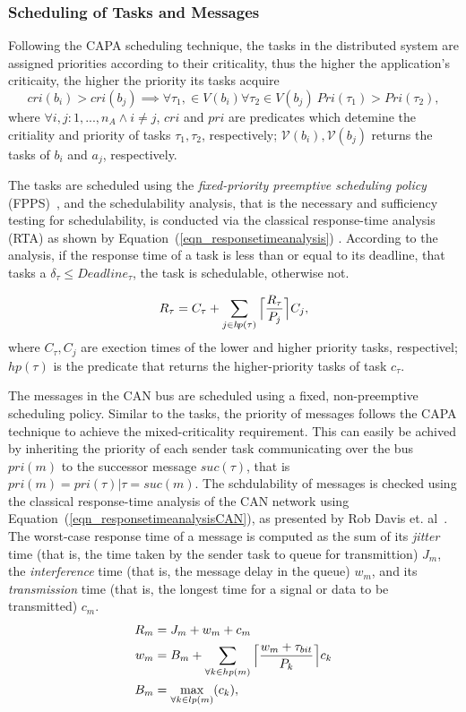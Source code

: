 \subsubsection{Scheduling of Tasks and Messages}\label{subsec_response-time_analysis}
Following the CAPA scheduling technique, the tasks in the distributed system are assigned priorities according to their criticality, thus the higher the application's criticaity, the higher the priority its tasks acquire
\[
cri(b_i)>cri(b_j)\implies \forall \tau_1,\in V(b_i)\forall \tau_2\in V(b_j)\ Pri(\tau_1)>Pri(\tau_2),
\]
where $\forall i,j:1,...,n_A\land i\neq j$, $cri$ and $pri$ are predicates which detemine the critiality and priority of tasks $\tau_1,\tau_2$, respectively; $\mathcal{V}(b_i), \mathcal{V}(b_j)$ returns the tasks of $b_i$ and $a_j$, respectively.

The tasks are scheduled using the \textit{fixed-priority preemptive scheduling policy} (FPPS)~\cite{Sha2004RealPerspective}, and the schedulability analysis, that is the necessary and sufficiency testing for schedulability, is conducted via the classical response-time analysis (RTA) as shown by Equation~(\ref{eqn_responsetimeanalysis}) \cite{Baruah2011Response-timeSystems,Baruah2011Response-timeSystems}. According to the analysis, if the response time of a task is less than or equal to its deadline, that tasks a $\delta_\tau\leq Deadline_\tau$, the task is schedulable, otherwise not. 

\begin{align}
\label{eqn_responsetimeanalysis}
R_\tau=C_\tau+\sum_{j\in h\!p(\tau)}
{
	\ceil[\Big]
	{
		\frac{R_\tau}{P_j}
	}C_j
},
\end{align}
where $C_\tau,C_j$ are exection times of the lower and higher priority tasks, respectivel; $h\!p(\tau)$ is the predicate that returns the higher-priority tasks of task $c_\tau$.

The messages in the CAN bus are scheduled using a fixed, non-preemptive scheduling policy. Similar to the tasks, the priority of messages follows the CAPA technique to achieve the mixed-criticality requirement. This can easily be achived by inheriting the priority of each sender task communicating over the bus $pri(m)$ to the successor message $suc(\tau)$, that is $pri(m)=pri(\tau)|\tau = suc(m)$. The schdulability of messages is checked using the classical response-time analysis of the CAN network using Equation~(\ref{eqn_responsetimeanalysisCAN}), as presented by Rob Davis et. al~\cite{Davis2007ControllerRevised}. The worst-case response time of a message is computed as the sum of its \textit{jitter} time (that is, the time  taken by the sender task to queue for transmittion) $J_m$, the \textit{interference} time (that is, the message delay in the queue) $w_m$, and its \textit{transmission} time  (that is, the longest time for a signal or data to be transmitted) $c_m$.
\begin{align}
\label{eqn_responsetimeanalysisCAN}
R_m&=J_m+w_m+c_m\\
\label{eqn_interference}
w_m&=B_m+
\sum_{\forall k\in hp(m)}
{
	\ceil[\Big]
	{
		\frac{w_m+\tau_{bit}}{P_k}
	}c_k
}\\
\label{eqn_iblocking}
B_m&=\max_{\forall k\in lp(m)}(c_k),
\end{align}

